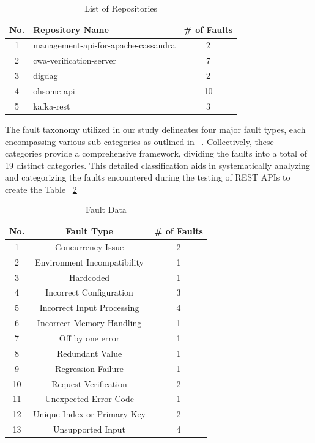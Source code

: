 \documentclass[conference]{IEEEtran}
\begin{document}
\begin{table}
    \centering
    \caption{List of Repositories}
    \label{tab:repositories}
    \begin{tabular}{|c|l|c|}
    \hline
        \hline
        \textbf{No.} & \textbf{Repository Name} & \textbf{\# of Faults} \\ \hline
        1 & management-api-for-apache-cassandra & 2 \\ \hline
        2 & cwa-verification-server &  7 \\ \hline
        3 & digdag & 2 \\ \hline
        4 & ohsome-api & 10 \\ \hline
        5 & kafka-rest & 3 \\ \hline
    \end{tabular}
\end{table}
    

The fault taxonomy utilized in our study delineates four major fault types, each encompassing various sub-categories as outlined in ~\cite{automatedTestTaxonomy}. Collectively, these categories provide a comprehensive framework, dividing the faults into a total of 19 distinct categories. 
This detailed classification aids in systematically analyzing and categorizing the faults encountered during the testing of REST APIs to create the Table ~\ref{tab:faultData}

\begin{table}[ht]
    \centering
    \caption{Fault Data}
    \label{tab:faultData}
    \begin{tabular}{|c|c|c|}
    \hline
        \hline
        \textbf{No.} & \textbf{Fault Type} & \textbf{\# of Faults} \\ \hline
        1 & Concurrency Issue & 2 \\ \hline
        2 & Environment Incompatibility &  1 \\ \hline
        3 & Hardcoded & 1 \\ \hline
        4 & Incorrect Configuration & 3 \\ \hline
        5 & Incorrect Input Processing & 4 \\ \hline
        6 & Incorrect Memory Handling & 1 \\ \hline
        7 & Off by one error & 1 \\ \hline
        8 & Redundant Value & 1 \\ \hline 
        9 & Regression Failure & 1 \\ \hline 
        10 & Request Verification & 2 \\ \hline
        11 & Unexpected Error Code & 1 \\ \hline
        12 & Unique Index or Primary Key & 2 \\ \hline
        13 & Unsupported Input & 4 \\ \hline
    \end{tabular}
\end{table}
\end{document}
